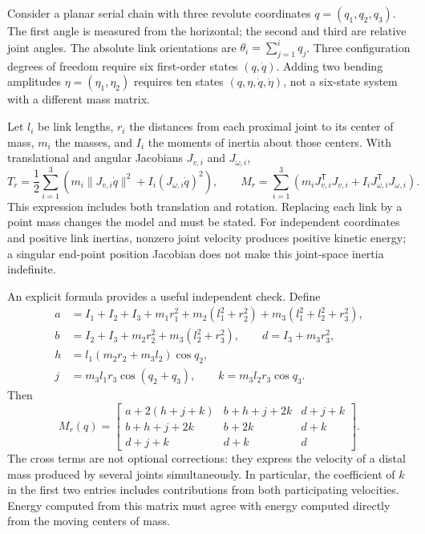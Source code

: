 Consider a planar serial chain with three revolute coordinates $q=(q_1,q_2,q_3)$. The first angle is measured from the horizontal; the second and third are relative joint angles. The absolute link orientations are $\theta_i=\sum_{j=1}^i q_j$. Three configuration degrees of freedom require six first-order states $(q,\dot q)$. Adding two bending amplitudes $\eta=(\eta_1,\eta_2)$ requires ten states $(q,\eta,\dot q,\dot\eta)$, not a six-state system with a different mass matrix.

Let $l_i$ be link lengths, $r_i$ the distances from each proximal joint to its center of mass, $m_i$ the masses, and $I_i$ the moments of inertia about those centers. With translational and angular Jacobians $J_{v,i}$ and $J_{\omega,i}$,
\begin{equation}
 T_r=\frac12\sum_{i=1}^3\left(m_i\|J_{v,i}\dot q\|^2+I_i(J_{\omega,i}\dot q)^2\right),\qquad
 M_r=\sum_{i=1}^3\left(m_iJ_{v,i}^{\mathsf T}J_{v,i}+I_iJ_{\omega,i}^{\mathsf T}J_{\omega,i}\right).
\end{equation}
This expression includes both translation and rotation. Replacing each link by a point mass changes the model and must be stated. For independent coordinates and positive link inertias, nonzero joint velocity produces positive kinetic energy; a singular end-point position Jacobian does not make this joint-space inertia indefinite.

An explicit formula provides a useful independent check. Define
\begin{equation}
\begin{aligned}
 a&=I_1+I_2+I_3+m_1r_1^2+m_2(l_1^2+r_2^2)+m_3(l_1^2+l_2^2+r_3^2),\\
 b&=I_2+I_3+m_2r_2^2+m_3(l_2^2+r_3^2),\qquad d=I_3+m_3r_3^2,\\
 h&=l_1(m_2r_2+m_3l_2)\cos q_2,\\
 j&=m_3l_1r_3\cos(q_2+q_3),\qquad k=m_3l_2r_3\cos q_3.
\end{aligned}
\end{equation}
Then
\begin{equation}
 M_r(q)=\begin{bmatrix}
 a+2(h+j+k)&b+h+j+2k&d+j+k\\
 b+h+j+2k&b+2k&d+k\\
 d+j+k&d+k&d
 \end{bmatrix}.
\end{equation}
The cross terms are not optional corrections: they express the velocity of a distal mass produced by several joints simultaneously. In particular, the coefficient of $k$ in the first two entries includes contributions from both participating velocities. Energy computed from this matrix must agree with energy computed directly from the moving centers of mass.

